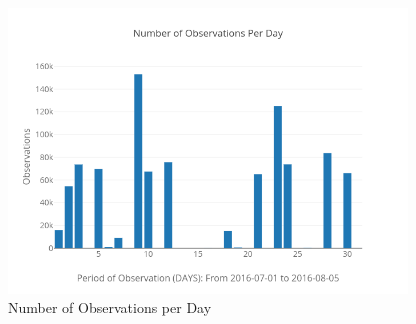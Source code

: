 \documentclass[11pt,fleqn]{book} %
\begin{document}
\begin{figure}[h!]%
\centering%
\includegraphics[width=400px]{Pictures/plots/good/Morelia Hive 2observationsPerdayUnclean.png}%
\caption{Number of Observations per Day}%
\end{figure}
\end{document}

